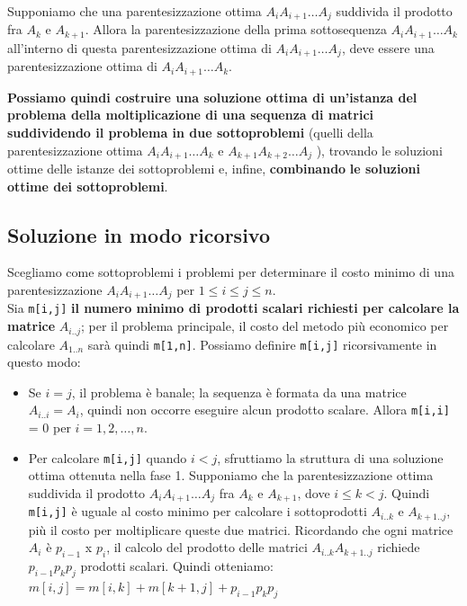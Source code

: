 \begin{myblockquote}
  Supponiamo che una parentesizzazione ottima $A_i A_{i+1} \ldots A_j$
  suddivida \linebreak il prodotto fra $A_k$ e $A_{k+1}$. Allora la
  parentesizzazione della prima sottosequenza $A_i A_{i+1} \ldots A_k$
  all'interno di questa parentesizzazione ottima di
  $A_i A_{i+1} \ldots A_j$, deve essere una parentesizzazione ottima di
  $A_i A_{i+1} \ldots A_k$.
\end{myblockquote}

\textbf{Possiamo quindi costruire una soluzione ottima di un'istanza del
  problema della moltiplicazione di una sequenza di matrici suddividendo
  il problema in due sottoproblemi} (quelli della parentesizzazione ottima
$A_i A_{i+1} \ldots A_k$ e $A_{k+1} A_{k+2} \ldots A_j$ ), trovando le
soluzioni ottime delle istanze dei sottoproblemi e, infine,
\textbf{combinando} \textbf{le soluzioni ottime dei sottoproblemi}.

\subsection{Soluzione in modo ricorsivo}

Scegliamo come sottoproblemi i problemi per determinare il costo minimo
di una parentesizzazione $A_i A_{i+1} \ldots A_j$ per
$1 \le i \le j \le n$.\\ Sia \texttt{m[i,j]} \textbf{il numero
  minimo di prodotti scalari richiesti per calcolare la matrice}
$A_{i..j}$; per il problema principale, il costo del metodo più
economico per calcolare $A_{1..n}$ sarà quindi \texttt{m[1,n]}.
Possiamo definire \texttt{m[i,j]} ricorsivamente in questo modo:
\begin{itemize}
  \item Se $i = j$, il problema è banale; la sequenza è formata da una matrice
        $A_{i..i} = A_i$, quindi non occorre eseguire alcun prodotto scalare.
        Allora \texttt{m[i,i]} = 0 per $i=1,2,\ldots,n$.
  \item Per calcolare \texttt{m[i,j]} quando $i < j$, sfruttiamo la struttura di una
        soluzione ottima ottenuta nella fase 1.
        Supponiamo che la parentesizzazione ottima suddivida il prodotto
        $A_i A_{i+1} \ldots A_j$ fra $A_k$ e $A_{k+1}$, dove $i \le k < j$.
        Quindi \texttt{m[i,j]} è uguale al costo minimo per calcolare i
        sottoprodotti $A_{i..k}$ e $A_{k+1..j}$, più il costo per
        moltiplicare queste due matrici. Ricordando che ogni matrice $A_i$ è
        $p_{i-1}$ x $p_i$, il calcolo del prodotto delle matrici
        $A_{i..k} A_{k+1..j}$ richiede $p_{i-1} p_k p_j$ prodotti scalari.
        Quindi otteniamo: $m[i,j] = m[i,k] + m[k+1,j] + p_{i-1} p_k p_j$
\end{itemize}


